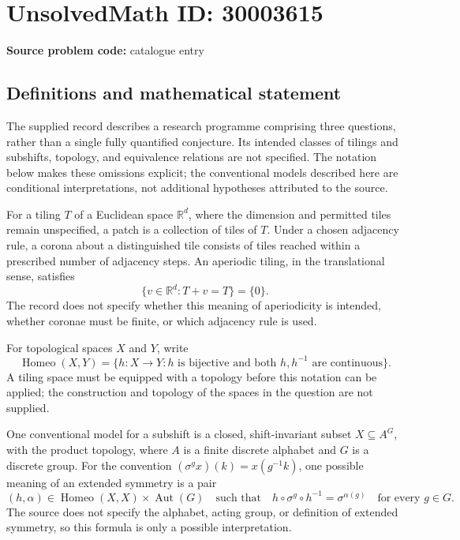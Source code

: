 \documentclass[11pt]{article}
\newcommand{\R}{\mathbb{R}}
\begin{document}
\section*{UnsolvedMath ID: 30003615}
\textbf{Source problem code:} catalogue entry
\subsection{Definitions and mathematical statement}
The supplied record describes a research programme comprising three questions, rather than a single fully quantified conjecture. Its intended classes of tilings and subshifts, topology, and equivalence relations are not specified. The notation below makes these omissions explicit; the conventional models described here are conditional interpretations, not additional hypotheses attributed to the source.

For a tiling \(T\) of a Euclidean space \(\R^d\), where the dimension and permitted tiles remain unspecified, a patch is a collection of tiles of \(T\). Under a chosen adjacency rule, a corona about a distinguished tile consists of tiles reached within a prescribed number of adjacency steps. An aperiodic tiling, in the translational sense, satisfies
\[
\{v\in\R^d:T+v=T\}=\{0\}.
\]
The record does not specify whether this meaning of aperiodicity is intended, whether coronae must be finite, or which adjacency rule is used.

For topological spaces \(X\) and \(Y\), write
\[
\operatorname{Homeo}(X,Y)=\{h:X\to Y:h\text{ is bijective and both }h,h^{-1}\text{ are continuous}\}.
\]
A tiling space must be equipped with a topology before this notation can be applied; the construction and topology of the spaces in the question are not supplied.

One conventional model for a subshift is a closed, shift-invariant subset \(X\subseteq A^G\), with the product topology, where \(A\) is a finite discrete alphabet and \(G\) is a discrete group. For the convention \((\sigma^g x)(k)=x(g^{-1}k)\), one possible meaning of an extended symmetry is a pair
\[
(h,\alpha)\in\operatorname{Homeo}(X,X)\times\operatorname{Aut}(G)
\quad\text{such that}\quad
h\circ\sigma^g\circ h^{-1}=\sigma^{\alpha(g)}
\quad\text{for every }g\in G.
\]
The source does not specify the alphabet, acting group, or definition of extended symmetry, so this formula is only a possible interpretation.
\end{document}
